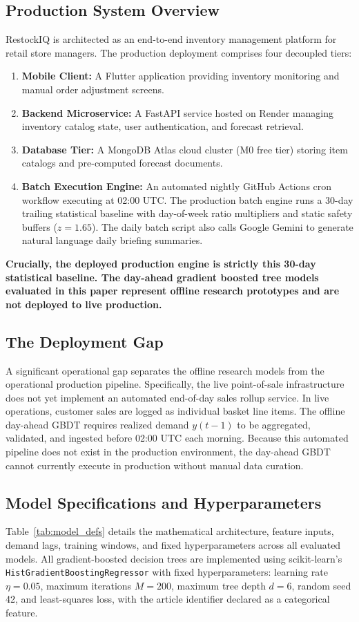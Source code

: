 \documentclass[conference]{IEEEtran}
\begin{document}
\subsection{Production System Overview}
RestockIQ is architected as an end-to-end inventory management platform for retail store managers. The production deployment comprises four decoupled tiers:
\begin{enumerate}
    \item \textbf{Mobile Client:} A Flutter application providing inventory monitoring and manual order adjustment screens.
    \item \textbf{Backend Microservice:} A FastAPI service hosted on Render managing inventory catalog state, user authentication, and forecast retrieval.
    \item \textbf{Database Tier:} A MongoDB Atlas cloud cluster (M0 free tier) storing item catalogs and pre-computed forecast documents.
    \item \textbf{Batch Execution Engine:} An automated nightly GitHub Actions cron workflow executing at 02:00 UTC. The production batch engine runs a 30-day trailing statistical baseline with day-of-week ratio multipliers and static safety buffers ($z=1.65$). The daily batch script also calls Google Gemini to generate natural language daily briefing summaries.
\end{enumerate}
\textbf{Crucially, the deployed production engine is strictly this 30-day statistical baseline. The day-ahead gradient boosted tree models evaluated in this paper represent offline research prototypes and are not deployed to live production.}

\subsection{The Deployment Gap}
A significant operational gap separates the offline research models from the operational production pipeline. Specifically, the live point-of-sale infrastructure does not yet implement an automated end-of-day sales rollup service. In live operations, customer sales are logged as individual basket line items. The offline day-ahead GBDT requires realized demand $y(t-1)$ to be aggregated, validated, and ingested before 02:00 UTC each morning. Because this automated pipeline does not exist in the production environment, the day-ahead GBDT cannot currently execute in production without manual data curation.

\subsection{Model Specifications and Hyperparameters}
Table~\ref{tab:model_defs} details the mathematical architecture, feature inputs, demand lags, training windows, and fixed hyperparameters across all evaluated models. All gradient-boosted decision trees are implemented using scikit-learn's \texttt{HistGradient\-Boosting\-Regressor} with fixed hyperparameters: learning rate $\eta = 0.05$, maximum iterations $M = 200$, maximum tree depth $d = 6$, random seed 42, and least-squares loss, with the article identifier declared as a categorical feature.
\end{document}
